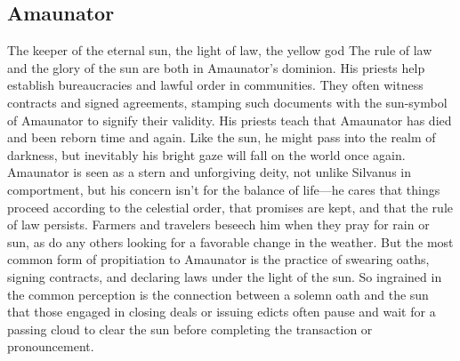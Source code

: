\documentclass[10pt,a4paper,twoside,twocolumn,openany,bg=print,nodeprecatedcode]{dndbook}
\begin{document}
\subsection{Amaunator}
The keeper of the eternal sun, the light of law, the yellow god
The rule of law and the glory of the sun are both in Amaunator's dominion. His priests help establish bureaucracies and lawful order in communities. They often witness contracts and signed agreements, stamping such documents with the sun-symbol of Amaunator to signify their validity.
His priests teach that Amaunator has died and been reborn time and again. Like the sun, he might pass into the realm of darkness, but inevitably his bright gaze will fall on the world once again. Amaunator is seen as a stern and unforgiving deity, not unlike Silvanus in comportment, but his concern isn't for the balance of life—he cares that things proceed according to the celestial order, that promises are kept, and that the rule of law persists.
Farmers and travelers beseech him when they pray for rain or sun, as do any others looking for a favorable change in the weather. But the most common form of propitiation to Amaunator is the practice of swearing oaths, signing contracts, and declaring laws under the light of the sun. So ingrained in the common perception is the connection between a solemn oath and the sun that those engaged in closing deals or issuing edicts often pause and wait for a passing cloud to clear the sun before completing the transaction or pronouncement.
\end{document}
